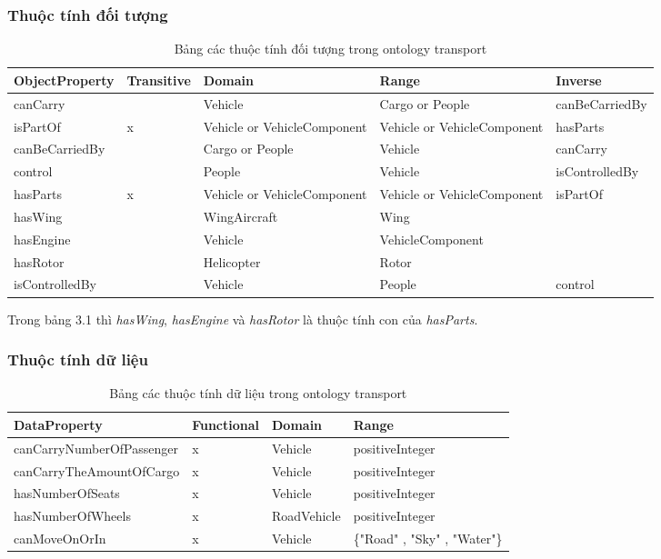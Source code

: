 {\subsubsection{Thuộc tính đối tượng}
\begin{table}[ht!]
	\centering
\begin{tabular}{|p{3cm}|l|p{3cm}|p{3cm}|p{3cm}|}
\hline
ObjectProperty & Transitive & Domain & Range & Inverse \\ \hline
canCarry & & Vehicle & Cargo or People & canBeCarriedBy \\ \hline
isPartOf & x & Vehicle or VehicleComponent & Vehicle or VehicleComponent & hasParts \\ \hline
canBeCarriedBy & & Cargo or People & Vehicle & canCarry \\ \hline
control &  & People & Vehicle & isControlledBy \\ \hline
hasParts & x & Vehicle or VehicleComponent & Vehicle or VehicleComponent & isPartOf \\ \hline
 hasWing & & WingAircraft & Wing & \\ \hline
 hasEngine & & Vehicle & VehicleComponent & \\ \hline
 hasRotor & & Helicopter & Rotor & \\ \hline
 isControlledBy & & Vehicle & People & control \\
\hline
\end{tabular}
\caption{Bảng các thuộc tính đối tượng trong ontology transport \label{overflow}}  
\end{table}
Trong bảng 3.1 thì \textit{hasWing}, \textit{hasEngine} và \textit{hasRotor} là thuộc tính con của \textit{hasParts}.
\subsubsection{Thuộc tính dữ liệu}
\begin{table}[ht!]
\centering
\begin{tabular}{|l|l|l|l|}
\hline
DataProperty & Functional & Domain & Range \\ \hline
canCarryNumberOfPassenger & x & Vehicle & positiveInteger \\ \hline
canCarryTheAmountOfCargo & x & Vehicle & positiveInteger  \\ \hline
hasNumberOfSeats & x & Vehicle & positiveInteger \\ \hline
hasNumberOfWheels & x & RoadVehicle & positiveInteger  \\ \hline
canMoveOnOrIn & x & Vehicle & \{"Road" , "Sky" , "Water"\}  \\ \hline
\end{tabular}
\caption{Bảng các thuộc tính dữ liệu trong ontology transport \label{overflow}}  
\end{table}
}
